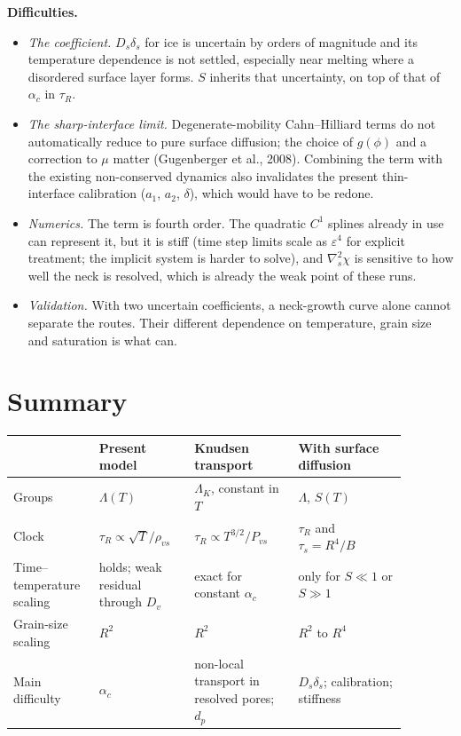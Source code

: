 \documentclass[11pt]{article}
\newcommand{\rvs}{\rho_{vs}}
\begin{document}
\textbf{Difficulties.}
\begin{itemize}
\item \emph{The coefficient.} $D_s\delta_s$ for ice is uncertain by orders of
  magnitude and its temperature dependence is not settled, especially near
  melting where a disordered surface layer forms. $S$ inherits that
  uncertainty, on top of that of $\alpha_c$ in $\tau_{R}$.
\item \emph{The sharp-interface limit.} Degenerate-mobility Cahn--Hilliard
  terms do not automatically reduce to pure surface diffusion; the choice of
  $g(\phi)$ and a correction to $\mu$ matter (Gugenberger et al., 2008).
  Combining the term with the existing non-conserved dynamics also
  invalidates the present thin-interface calibration ($a_1$, $a_2$,
  $\delta$), which would have to be redone.
\item \emph{Numerics.} The term is fourth order. The quadratic $C^{1}$
  splines already in use can represent it, but it is stiff (time step
  limits scale as $\varepsilon^{4}$ for explicit treatment; the implicit
  system is harder to solve), and $\nabla_s^{2}\chi$ is sensitive to how well
  the neck is resolved, which is already the weak point of these runs.
\item \emph{Validation.} With two uncertain coefficients, a neck-growth
  curve alone cannot separate the routes. Their different dependence on
  temperature, grain size and saturation is what can.
\end{itemize}

\section{Summary}

\begin{center}\footnotesize\begin{tabular}{p{0.17\linewidth}p{0.22\linewidth}p{0.24\linewidth}p{0.25\linewidth}}\toprule
 & Present model & Knudsen transport & With surface diffusion\\\midrule
Groups & $\Lambda(T)$ & $\Lambda_K$, constant in $T$ & $\Lambda$, $S(T)$\\
Clock & $\tau_{R} \propto \sqrt T/\rvs$ & $\tau_{R} \propto T^{3/2}/P_{vs}$ & $\tau_{R}$ and $\tau_s = R^{4}/B$\\
Time--temperature scaling & holds; weak residual through $D_v$ & exact for constant $\alpha_c$ & only for $S \ll 1$ or $S \gg 1$\\
Grain-size scaling & $R^{2}$ & $R^{2}$ & $R^{2}$ to $R^{4}$\\
Main difficulty & $\alpha_c$ & non-local transport in resolved pores; $d_p$ & $D_s\delta_s$; calibration; stiffness\\\bottomrule
\end{tabular}\end{center}
\end{document}
